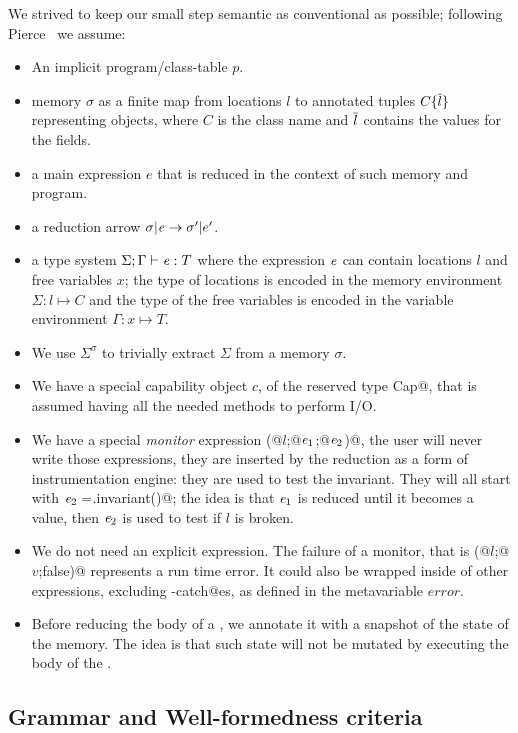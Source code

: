 \noindent We strived to keep our small step semantic as conventional as possible; following Pierce~\cite{pierce2002types} we assume:
\begin{itemize}
\item An implicit program/class-table $p$.
\item memory $\sigma$ as a finite map from locations $l$ to annotated tuples $C\{\hspace{0.03ex} \overline{\hspace{-0.03ex}l\hspace{-0.03ex}} \hspace{0.03ex}\}$ representing objects,
where $C$ is the class name and $\hspace{0.03ex} \overline{\hspace{-0.03ex}l\hspace{-0.03ex}} \hspace{0.03ex}$ contains the values for the fields.
\item a main expression $e$ that is reduced in the context of such memory and program.
\item a reduction arrow $\sigma|\e\rightarrow \sigma'|e'$.
\item a type system $\Sigma;\Gamma\vdash\e:T$ where 
the expression ${\mathit{e}}$ can contain locations $l$ and free variables $x$;
the type of locations is encoded in the memory environment $\Sigma: l\mapsto C$
and the type of the free variables is encoded in the variable environment $\Gamma: x\mapsto T$.
\item We use $\Sigma^\sigma$ to trivially extract $\Sigma$ from a memory $\sigma$.
\item We have a special capability object $c$, of the reserved type
\Q@mut Cap@, that is assumed having all the needed methods to perform I/O.
\item We have a special \emph{monitor} expression \Q@M(@$l$\Q@;@${\mathit{e}}_1$\Q@;@${\mathit{e}}_2$\Q@)@,
the user will never write those expressions, they are inserted by the reduction as
a form of instrumentation engine: they are used to test the invariant.
They will all start with ${\mathit{e}}_2=$\Q@l.invariant()@;
the idea is that ${\mathit{e}}_1$ is reduced until it becomes a value, then
${\mathit{e}}_2$ is used to test if $l$ is broken.
\item We do not need an explicit \Q@error@  expression.
The failure of a monitor, that is 
\Q@M(@$l$\Q@;@$v$\Q@;false)@ represents a run time error. It could also be wrapped inside
of other expressions, excluding \Q@try-catch@es, as defined in the metavariable $\mathit{error}$.
\item Before reducing the body of a \Q@try@, we annotate it with a snapshot of 
the state of the memory. The idea is that such state will not be mutated by executing
the body of the \Q@try@.

\end{itemize}

\subsection{Grammar and Well-formedness criteria}

